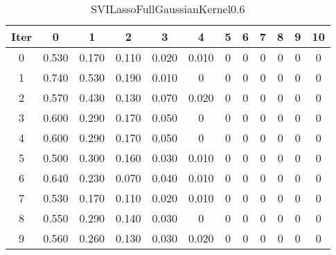 \begin{table}
	\begin{center}
		\begin{tabular}{|c|c|c|c|c|c|c|c|c|c|c|c|}
			\hline
			Iter & 0 & 1 & 2 & 3 & 4 & 5 & 6 & 7 & 8 & 9 & 10 \\
			\hline
			0 & 0.530 & 0.170 & 0.110 & 0.020 & 0.010 & 0 & 0 & 0 & 0 & 0 & 0 \\
			\hline
			1 & 0.740 & 0.530 & 0.190 & 0.010 & 0 & 0 & 0 & 0 & 0 & 0 & 0 \\
			\hline
			2 & 0.570 & 0.430 & 0.130 & 0.070 & 0.020 & 0 & 0 & 0 & 0 & 0 & 0 \\
			\hline
			3 & 0.600 & 0.290 & 0.170 & 0.050 & 0 & 0 & 0 & 0 & 0 & 0 & 0 \\
			\hline
			4 & 0.600 & 0.290 & 0.170 & 0.050 & 0 & 0 & 0 & 0 & 0 & 0 & 0 \\
			\hline
			5 & 0.500 & 0.300 & 0.160 & 0.030 & 0.010 & 0 & 0 & 0 & 0 & 0 & 0 \\
			\hline
			6 & 0.640 & 0.230 & 0.070 & 0.040 & 0.010 & 0 & 0 & 0 & 0 & 0 & 0 \\
			\hline
			7 & 0.530 & 0.170 & 0.110 & 0.020 & 0.010 & 0 & 0 & 0 & 0 & 0 & 0 \\
			\hline
			8 & 0.550 & 0.290 & 0.140 & 0.030 & 0 & 0 & 0 & 0 & 0 & 0 & 0 \\
			\hline
			9 & 0.560 & 0.260 & 0.130 & 0.030 & 0.020 & 0 & 0 & 0 & 0 & 0 & 0 \\
			\hline
		\end{tabular}
	\end{center}
	\caption{SVILassoFullGaussianKernel0.6}
\end{table}
